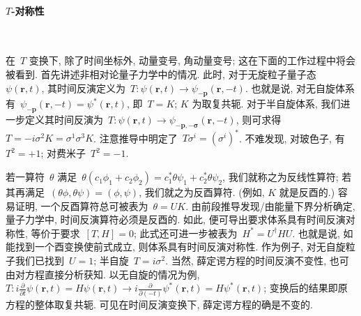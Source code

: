 \paragraph{$T$-对称性}~

在~$T$ 变换下, 除了时间坐标外, 动量变号, 角动量变号; 这在下面的工作过程中将会被看到. 首先讲述非相对论量子力学中的情况. 此时, 对于无旋粒子量子态~$\psi(\bm{r},t)$, 其时间反演定义为~$T:\psi(\bm{r},t)\rightarrow \psi_{-\bm{p}}(\bm{r},-t)$. 也就是说, 对无自旋体系有~$\psi_{-\bm{p}}(\bm{r},-t)=\psi^*(\bm{r},t)$, 即~$T=K$; $K$ 为取复共轭. 对于半自旋体系, 我们进一步定义其时间反演为~$T:\psi(\bm{r},t)\rightarrow \psi_{-\bm{p},-\bm{\sigma}}(\bm{r},-t)$, 则可求得~$T=-i\sigma^2K=\sigma^1\sigma^3 K$. 注意推导中明定了~$T\sigma^i=(\sigma^i)^*$. 不难发现, 对玻色子, 有~$T^2=+1$; 对费米子~$T^2=-1$.

若一算符~$\theta$ 满足~$\theta(c_1\phi_1+c_2\phi_2)=c^*_1\theta\psi_1+c^*_2\theta\psi_2$, 我们就称之为反线性算符; 若其再满足~$(\theta\phi,\theta\psi)=(\phi,\psi)$, 我们就之为反酉算符. (例如, $K$ 就是反酉的.) 容易证明, 一个反酉算符总可被表为~$\theta=UK$. 由前段推导发现/由能量下界分析确定, 量子力学中, 时间反演算符必须是反酉的. 如此, 便可导出要求体系具有时间反演对称性, 等价于要求~$[T,H]=0$; 此式还可进一步被表为~$H^*=U^\dag HU$. 也就是说, 如能找到一个酉变换使前式成立, 则体系具有时间反演对称性. 作为例子, 对无自旋粒子我们已找到~$U=1$; 半自旋~$T=i\sigma^2$. 当然, 薛定谔方程的时间反演不变性, 也可由对方程直接分析获知. 以无自旋的情况为例, $T:i\frac{\partial}{\partial t}\psi(\bm{r},t)=H\psi(\bm{r},t)\rightarrow i\frac{\partial}{\partial (-t)}\psi^*(\bm{r},t)=H\psi^*(\bm{r},t)$; 变换后的结果即原方程的整体取复共轭. 可见在时间反演变换下, 薛定谔方程的确是不变的.

